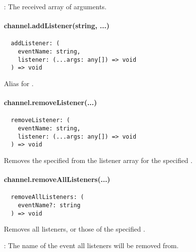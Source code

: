 \begin{arguments}
  \item {}: The received array of arguments.
\end{arguments}


\paragraph{channel.addListener(string, ...)}

\begin{verbatim}
  addListener: (
    eventName: string,
    listener: (...args: any[]) => void
  ) => void
\end{verbatim}

Alias for .


\paragraph{channel.removeListener(...)}

\begin{verbatim}
  removeListener: (
    eventName: string,
    listener: (...args: any[]) => void
  ) => void
\end{verbatim}

Removes the specified  from the listener array for the specified .


\paragraph{channel.removeAllListeners(...)}

\begin{verbatim}
  removeAllListeners: (
    eventName?: string
  ) => void
\end{verbatim}

Removes all listeners, or those of the specified .

\begin{arguments}
  \item {}: The name of the event all listeners will be removed from.
\end{arguments}
